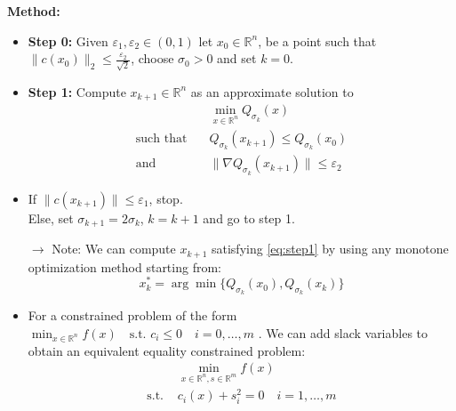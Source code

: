 \documentclass[12pt, openany]{report}
\newcommand{\R}{\mathbb{R}}
\renewcommand{\O}{\mathcal{O}}
\theoremstyle{definition}
\begin{document}
\textbf{Method:}
\begin{itemize}
	\item \textbf{Step 0:} Given $\varepsilon_1, \varepsilon_2 \in (0,1)$ let $x_0 \in \R^n$, be a point such that $\|c(x_0)\|_2 \leq \frac{\varepsilon_2}{\sqrt{2}}$, choose $\sigma_0 > 0$ and set $k=0$.
	\item \textbf{Step 1:} Compute $x_{k+1} \in \R^n$ as an approximate solution to 
	\begin{equation}\label{eq:step1}
		\begin{aligned}
			&\min_{x \in \R^n} Q_{\sigma_k}(x)\\
			\text{such that} \quad &Q_{\sigma_k}(x_{k+1}) \leq Q_{\sigma_k}(x_0)\\
			\text{and} \quad &\|\nabla Q_{\sigma_k}(x_{k+1})\| \leq \varepsilon_2 
		\end{aligned}
	\end{equation}
	\item If $\|c(x_{k+1})\| \leq \varepsilon_1$, stop.\\
	Else, set $\sigma_{k+1} = 2 \sigma_k$, $k = k+1$ and go to step 1.
\end{itemize}
\begin{itemize}
	\item [$\to$] Note: We can compute $x_{k+1}$ satisfying \eqref{eq:step1} by using any monotone optimization method starting from:
	\begin{equation}
		x_k^* = \arg \min \{Q_{\sigma_k}(x_0), Q_{\sigma_k}(x_k)\}
	\end{equation}
	\item For a constrained problem of the form $\displaystyle \min_{x \in \R^n} f(x) \quad \text{s.t. } c_i \leq 0 \quad i=0, \dots, m$ . We can add slack variables to obtain an equivalent equality constrained problem:
	\begin{equation}
		\begin{aligned}
			&\min_{x \in \R^n, s \in \R^m} f(x)\\
			\text{s.t. } &c_i(x) + s^2_i= 0 \quad i=1,\dots,m\\
		\end{aligned}
	\end{equation}
\end{itemize}
\end{document}
